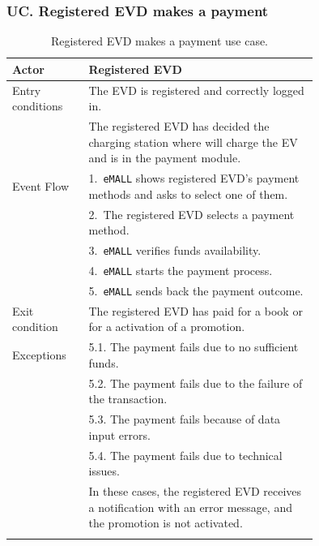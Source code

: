 \subsubsection*{UC\cuc . Registered EVD makes a payment}
\begin{center}
    \begin{longtable}{lp{0.75\linewidth}}
        \hline
        Actor            & Registered EVD                                                                                                        \\
        \hline
        Entry conditions & The EVD is registered and correctly logged in.                                                                        \\
        & The registered EVD has decided the charging station where will charge the EV and is in the payment module.            \\
        \hline
        Event Flow       & 1.\ \verb|eMALL| shows registered EVD's payment methods and asks to select one of them.                               \\
        & 2.\ The registered EVD selects a payment method.                                                                      \\
        & 3.\ \verb|eMALL| verifies funds availability.                                                                         \\
        & 4.\ \verb|eMALL| starts the payment process.                                                                          \\
        & 5.\ \verb|eMALL| sends back the payment outcome.                                                                      \\
        \hline
        Exit condition   & The registered EVD has paid for a book or for a activation of a promotion.                                            \\
        \hline
        Exceptions       & 5.1. The payment fails due to no sufficient funds.                                                                    \\
        & 5.2. The payment fails due to the failure of the transaction.                                                         \\
        & 5.3. The payment fails because of data input errors.                                                                  \\
        & 5.4. The payment fails due to technical issues.                                                                       \\
        & In these cases, the registered EVD receives a notification with an error message, and the promotion is not activated. \\
        \hline
        \caption{Registered EVD makes a payment use case.}
        \label{tab: EVD_pays_use_case}
    \end{longtable}


\end{center}
